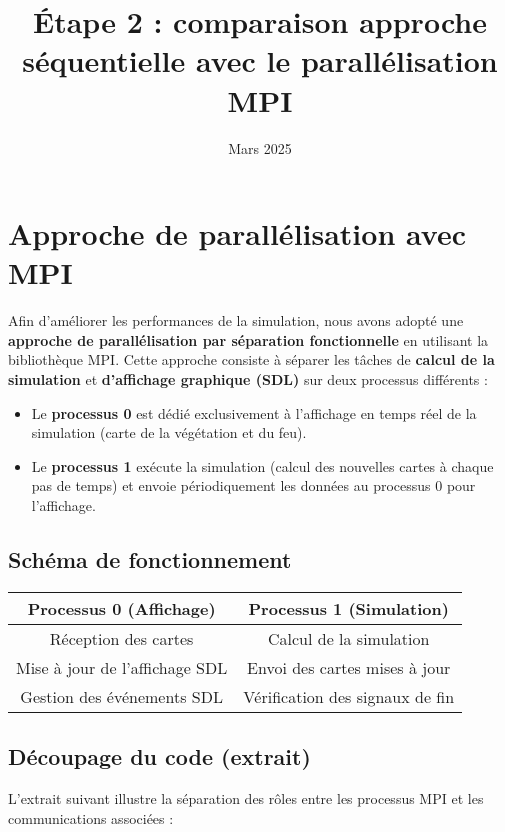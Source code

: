 \documentclass[a4paper,12pt]{article}
\title{Étape 2 : comparaison approche séquentielle avec le parallélisation MPI}
\author{}
\date{Mars 2025}
\begin{document}
\section{Approche de parallélisation avec MPI}

Afin d'améliorer les performances de la simulation, nous avons adopté une \textbf{approche de parallélisation par séparation fonctionnelle} en utilisant la bibliothèque MPI. Cette approche consiste à séparer les tâches de \textbf{calcul de la simulation} et \textbf{d'affichage graphique (SDL)} sur deux processus différents :

\begin{itemize}
    \item Le \textbf{processus 0} est dédié exclusivement à l'affichage en temps réel de la simulation (carte de la végétation et du feu).
    \item Le \textbf{processus 1} exécute la simulation (calcul des nouvelles cartes à chaque pas de temps) et envoie périodiquement les données au processus 0 pour l'affichage.
\end{itemize}

\subsection{Schéma de fonctionnement}

\begin{center}
\begin{tabular}{|c|c|}
\hline
\textbf{Processus 0 (Affichage)} & \textbf{Processus 1 (Simulation)} \\
\hline
Réception des cartes & Calcul de la simulation \\
Mise à jour de l'affichage SDL & Envoi des cartes mises à jour \\
Gestion des événements SDL & Vérification des signaux de fin \\
\hline
\end{tabular}
\end{center}

\subsection{Découpage du code (extrait)}

L'extrait suivant illustre la séparation des rôles entre les processus MPI et les communications associées :
\end{document}
